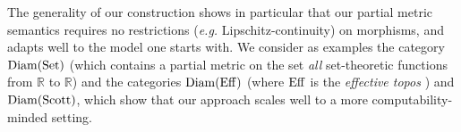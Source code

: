 The generality of our construction shows in particular that our partial metric semantics requires no restrictions (\textit{e.g.} Lipschitz-continuity) on morphisms, and adapts well to the model one starts with. We consider as examples the category $\operatorname{Diam}(\operatorname{Set})$  (which contains a partial metric on the set \emph{all}  set-theoretic functions from $\mathbb R$ to $\mathbb R$) and the categories $\operatorname{Diam}(\operatorname{Eff})$ (where $\operatorname{Eff}$ is the \emph{effective topos} \cite{hyland:effective-topos}) and $\operatorname{Diam}(\operatorname{Scott})$, which show that our approach scales well to a more computability-minded setting.




%
%
%      
%
%


